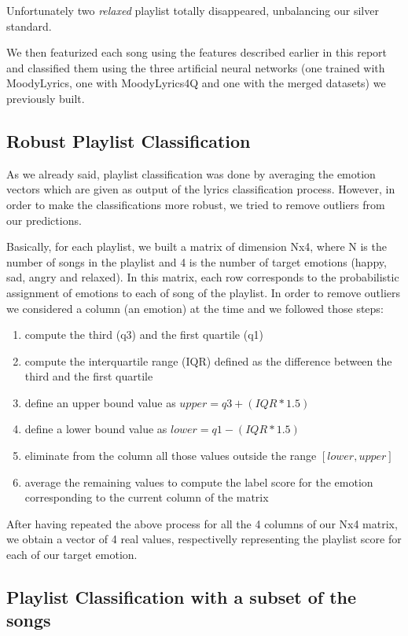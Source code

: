 Unfortunately two \textit{relaxed} playlist totally disappeared, unbalancing our silver standard.

We then featurized each song using the features described earlier in this report and classified them using the three artificial neural networks (one trained with MoodyLyrics, one with MoodyLyrics4Q and one with the merged datasets) we previously built.

\subsection{Robust Playlist Classification}

As we already said, playlist classification was done by averaging the emotion vectors which are given as output of the lyrics classification process. However, in order to make the classifications more robust, we tried to remove outliers from our predictions.

Basically, for each playlist, we built a matrix of dimension Nx4, where N is the number of songs in the playlist and 4 is the number of target emotions (happy, sad, angry and relaxed). In this matrix, each row corresponds to the probabilistic assignment of emotions to each of song of the playlist. In order to remove outliers we considered a column (an emotion) at the time and we followed those steps:
\begin{enumerate}
\item compute the third (q3) and the first quartile (q1)
\item compute the interquartile range (IQR) defined as the difference between the third and the first quartile
\item define an upper bound value as $upper = q3 + (IQR * 1.5)$
\item define a lower bound value as $lower = q1 - (IQR * 1.5)$
\item eliminate from the column all those values outside the range $[lower, upper]$
\item average the remaining values to compute the label score for the emotion corresponding to the current column of the matrix
\end{enumerate}

After having repeated the above process for all the 4 columns of our Nx4 matrix, we obtain a vector of 4 real values, respectivelly representing the playlist score for each of our target emotion.

\subsection{Playlist Classification with a subset of the songs}


